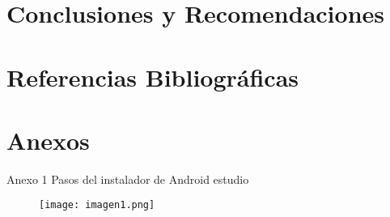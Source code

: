 \documentclass[12pt,letterpaper]{article}
\begin{document}

\section{Conclusiones y Recomendaciones}



\section{Referencias Bibliográficas}
\printbibliography[heading=none]


\section{Anexos}
Anexo 1 Pasos del instalador de Android estudio
\begin{figure}[h!]
    \centering
    \texttt{[image: imagen1.png]}
\end{figure}
\end{document}
